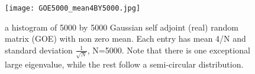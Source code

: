 \documentclass[12pt]{amsart}
\theoremstyle{definition}
\theoremstyle{remark}
\begin{document}






\begin{figure}[!]
    \centering
\texttt{[image: GOE5000\_mean4BY5000.jpg]}
    \caption{a  histogram of 5000 by 5000 Gaussian self adjoint (real) random matrix (GOE) with non zero mean. Each entry has mean 4/N and standard deviation $\frac{1}{\sqrt{N}}$, N=5000. Note that there is one exceptional large eigenvalue, while the rest follow a semi-circular distribution.}
     \label{fig0}
\end{figure}
\end{document}
